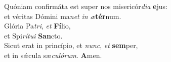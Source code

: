 \evenverse Quóniam confirmáta est super nos misericór\textit{di}\textit{a} \textbf{e}jus:~\*\\
\evenverse et véritas Dómini ma\textit{net} \textit{in} \textit{æ}\textbf{tér}num.\\
\oddverse Glória Pa\textit{tri}, \textit{et} \textbf{Fí}lio,~\*\\
\oddverse et Spi\textit{rí}\textit{tu}\textit{i} \textbf{San}cto.\\
\evenverse Sicut erat in princípio, et \textit{nunc}, \textit{et} \textbf{sem}per,~\*\\
\evenverse et in sǽcula sæ\textit{cu}\textit{ló}\textit{rum}. \textbf{A}men.\\
